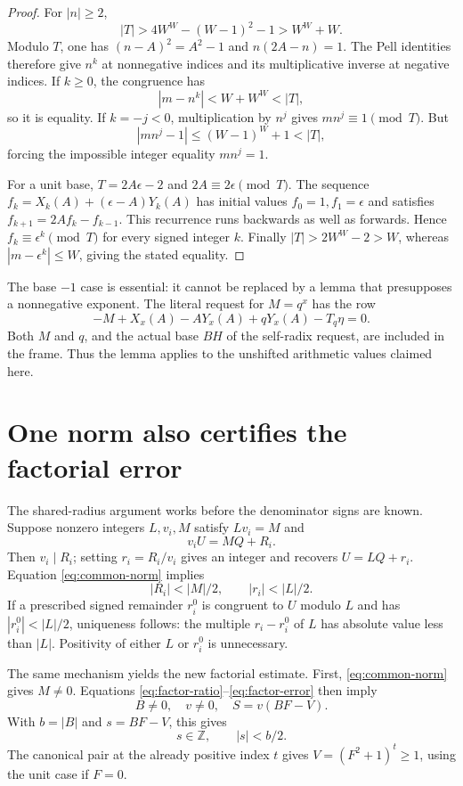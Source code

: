 \begin{proof}
For \(|n|\ge2\),
\[
 |T|>4W^W-(W-1)^2-1>W^W+W.
\]
Modulo \(T\), one has
\((n-A)^2=A^2-1\) and \(n(2A-n)=1\).
The Pell identities therefore give \(n^k\) at nonnegative indices
and its multiplicative inverse at negative indices. If \(k\ge0\),
the congruence has
\[
 |m-n^k|<W+W^W<|T|,
\]
so it is equality. If \(k=-j<0\), multiplication by \(n^j\) gives
\(mn^j\equiv1\pmod T\). But
\[
 |mn^j-1|\le(W-1)^W+1<|T|,
\]
forcing the impossible integer equality \(mn^j=1\).

For a unit base, \(T=2A\epsilon-2\) and \(2A\equiv2\epsilon\pmod T\).
The sequence
\(f_k=X_k(A)+(\epsilon-A)Y_k(A)\) has initial values
\(f_0=1,f_1=\epsilon\) and satisfies
\(f_{k+1}=2Af_k-f_{k-1}\). This recurrence runs backwards as well
as forwards. Hence \(f_k\equiv\epsilon^k\pmod T\) for every signed
integer \(k\). Finally \(|T|>2W^W-2>W\), whereas
\(|m-\epsilon^k|\le W\), giving the stated equality.
\end{proof}

The base \(-1\) case is essential: it cannot be replaced by a lemma
that presupposes a nonnegative exponent. The literal request for
\(M=q^x\) has the row
\[
 -M+X_x(A)-AY_x(A)+qY_x(A)-T_q\eta=0.
\]
Both \(M\) and \(q\), and the actual base \(BH\) of the self-radix
request, are included in the frame. Thus the lemma applies to the
unshifted arithmetic values claimed here.

\section{One norm also certifies the factorial error}

The shared-radius argument works before the denominator signs are known.
Suppose nonzero integers \(L,v_i,M\) satisfy \(Lv_i=M\) and
\[
 v_i U=M Q+R_i.
\]
Then \(v_i\mid R_i\); setting \(r_i=R_i/v_i\) gives an integer and
recovers \(U=LQ+r_i\). Equation \eqref{eq:common-norm} implies
\[
 |R_i|<|M|/2,\qquad |r_i|<|L|/2.
\]
If a prescribed signed remainder \(r_i^0\) is congruent to \(U\)
modulo \(L\) and has \(|r_i^0|<|L|/2\), uniqueness follows:
the multiple \(r_i-r_i^0\) of \(L\) has absolute value less than \(|L|\).
Positivity of either \(L\) or \(r_i^0\) is unnecessary.

The same mechanism yields the new factorial estimate.
First, \eqref{eq:common-norm} gives \(M\ne0\).
Equations \eqref{eq:factor-ratio}--\eqref{eq:factor-error} then imply
\[
 B\ne0,\quad v\ne0,\quad S=v(BF-V).
\]
With \(b=|B|\) and \(s=BF-V\), this gives
\begin{equation}\label{eq:near}
 s\in\mathbb Z,\qquad |s|<b/2.
\end{equation}
The canonical pair at the already positive index \(t\) gives
\(V=(F^2+1)^t\ge1\), using the unit case if \(F=0\).

